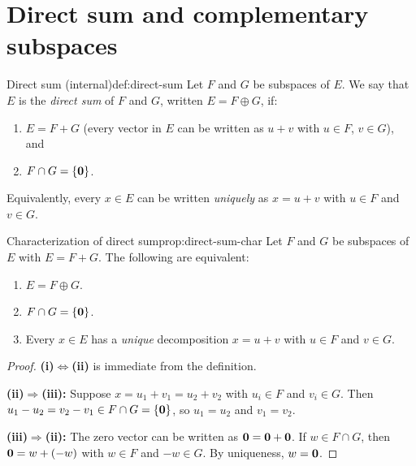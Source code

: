 \section{Direct sum and complementary subspaces}\label{sec:direct-sum}

\begin{definition}{Direct sum (internal)}{def:direct-sum}
Let $F$ and $G$ be subspaces of $E$. We say that $E$ is the
\emph{direct sum} of $F$ and $G$, written $E = F\oplus G$, if:
\begin{enumerate}[label=(\roman*)]
  \item $E = F + G$ (every vector in $E$ can be written as $u+v$ with
    $u\in F$, $v\in G$), and
  \item $F\cap G = \left\{\mathbf{0}\right\}$.
\end{enumerate}
Equivalently, every $x\in E$ can be written \emph{uniquely} as $x=u+v$
with $u\in F$ and $v\in G$.
\end{definition}

\begin{proposition}{Characterization of direct sum}{prop:direct-sum-char}
Let $F$ and $G$ be subspaces of $E$ with $E = F+G$. The following are
equivalent:
\begin{enumerate}[label=(\roman*)]
  \item $E = F\oplus G$.
  \item $F\cap G = \left\{\mathbf{0}\right\}$.
  \item Every $x\in E$ has a \emph{unique} decomposition $x = u + v$
    with $u\in F$ and $v\in G$.
\end{enumerate}
\end{proposition}

\begin{proof}
\textbf{(i)$\Leftrightarrow$(ii)} is immediate from the definition.

\textbf{(ii)$\Rightarrow$(iii):} Suppose $x = u_1+v_1 = u_2+v_2$ with
$u_i\in F$ and $v_i\in G$. Then $u_1-u_2 = v_2-v_1\in F\cap G = \left\{\mathbf{0}\right\}$,
so $u_1=u_2$ and $v_1=v_2$.

\textbf{(iii)$\Rightarrow$(ii):} The zero vector can be written as
$\mathbf{0} = \mathbf{0} + \mathbf{0}$. If $w\in F\cap G$, then
$\mathbf{0} = w + (-w)$ with $w\in F$ and $-w\in G$. By uniqueness,
$w = \mathbf{0}$.
\end{proof}

